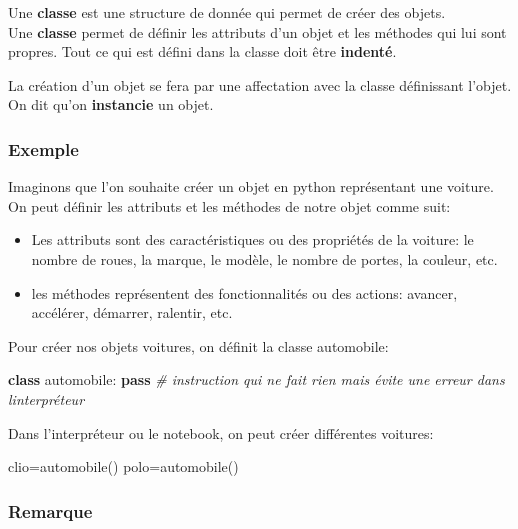 \documentclass[11pt]{article}
\providecommand{\tightlist}{%
      \setlength{\itemsep}{0pt}\setlength{\parskip}{0pt}}
\newenvironment{Shaded}{}{}
\newcommand{\KeywordTok}[1]{\textcolor[rgb]{0.00,0.44,0.13}{\textbf{{#1}}}}
\newcommand{\CommentTok}[1]{\textcolor[rgb]{0.38,0.63,0.69}{\textit{{#1}}}}
\newcommand{\NormalTok}[1]{{#1}}
\newcommand{\ControlFlowTok}[1]{\textcolor[rgb]{0.00,0.44,0.13}{\textbf{{#1}}}}
\newcommand{\OperatorTok}[1]{\textcolor[rgb]{0.40,0.40,0.40}{{#1}}}
\begin{document}
Une \textbf{classe} est une structure de donnée qui permet de créer des
objets.\\
Une \textbf{classe} permet de définir les attributs d'un objet et les
méthodes qui lui sont propres. Tout ce qui est défini dans la classe
doit être \textbf{indenté}.

La création d'un objet se fera par une affectation avec la classe
définissant l'objet. On dit qu'on \textbf{instancie} un objet.

    \hypertarget{exemple}{%
\subsubsection*{Exemple}\label{exemple}}

Imaginons que l'on souhaite créer un objet en python représentant une
voiture. On peut définir les attributs et les méthodes de notre objet
comme suit:

\begin{itemize}
\tightlist
\item
  Les attributs sont des caractéristiques ou des propriétés de la
  voiture: le nombre de roues, la marque, le modèle, le nombre de
  portes, la couleur, etc.
\item
  les méthodes représentent des fonctionnalités ou des actions: avancer,
  accélérer, démarrer, ralentir, etc.
\end{itemize}

Pour créer nos objets voitures, on définit la classe automobile:

\begin{Shaded}
\begin{Highlighting}[]
\KeywordTok{class}\NormalTok{ automobile:}
    \ControlFlowTok{pass} \CommentTok{\# instruction qui ne fait rien mais évite une erreur dans l\textquotesingle{}interpréteur}
\end{Highlighting}
\end{Shaded}

Dans l'interpréteur ou le notebook, on peut créer différentes voitures:

\begin{Shaded}
\begin{Highlighting}[]
\NormalTok{clio}\OperatorTok{=}\NormalTok{automobile()}
\NormalTok{polo}\OperatorTok{=}\NormalTok{automobile()}
\end{Highlighting}
\end{Shaded}

\hypertarget{remarque}{%
\subsubsection*{Remarque}\label{remarque}}
\end{document}
